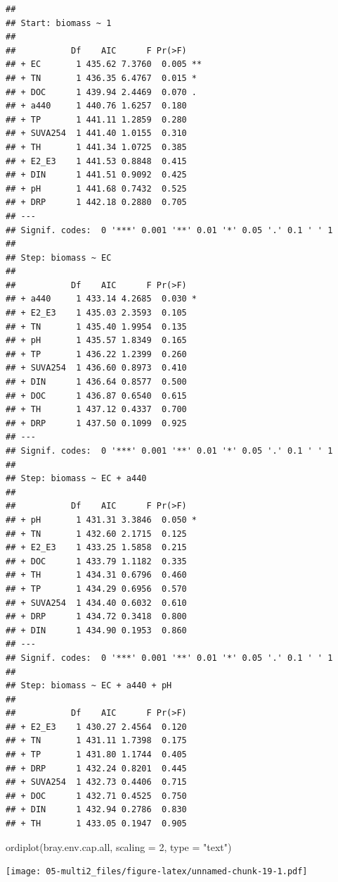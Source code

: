 \documentclass[
]{book}
\newenvironment{Shaded}{\begin{snugshade}}{\end{snugshade}}
\newcommand{\AttributeTok}[1]{\textcolor[rgb]{0.77,0.63,0.00}{#1}}
\newcommand{\DecValTok}[1]{\textcolor[rgb]{0.00,0.00,0.81}{#1}}
\newcommand{\FunctionTok}[1]{\textcolor[rgb]{0.00,0.00,0.00}{#1}}
\newcommand{\NormalTok}[1]{#1}
\newcommand{\StringTok}[1]{\textcolor[rgb]{0.31,0.60,0.02}{#1}}
\begin{document}
\begin{verbatim}
## 
## Start: biomass ~ 1 
## 
##           Df    AIC      F Pr(>F)   
## + EC       1 435.62 7.3760  0.005 **
## + TN       1 436.35 6.4767  0.015 * 
## + DOC      1 439.94 2.4469  0.070 . 
## + a440     1 440.76 1.6257  0.180   
## + TP       1 441.11 1.2859  0.280   
## + SUVA254  1 441.40 1.0155  0.310   
## + TH       1 441.34 1.0725  0.385   
## + E2_E3    1 441.53 0.8848  0.415   
## + DIN      1 441.51 0.9092  0.425   
## + pH       1 441.68 0.7432  0.525   
## + DRP      1 442.18 0.2880  0.705   
## ---
## Signif. codes:  0 '***' 0.001 '**' 0.01 '*' 0.05 '.' 0.1 ' ' 1
## 
## Step: biomass ~ EC 
## 
##           Df    AIC      F Pr(>F)  
## + a440     1 433.14 4.2685  0.030 *
## + E2_E3    1 435.03 2.3593  0.105  
## + TN       1 435.40 1.9954  0.135  
## + pH       1 435.57 1.8349  0.165  
## + TP       1 436.22 1.2399  0.260  
## + SUVA254  1 436.60 0.8973  0.410  
## + DIN      1 436.64 0.8577  0.500  
## + DOC      1 436.87 0.6540  0.615  
## + TH       1 437.12 0.4337  0.700  
## + DRP      1 437.50 0.1099  0.925  
## ---
## Signif. codes:  0 '***' 0.001 '**' 0.01 '*' 0.05 '.' 0.1 ' ' 1
## 
## Step: biomass ~ EC + a440 
## 
##           Df    AIC      F Pr(>F)  
## + pH       1 431.31 3.3846  0.050 *
## + TN       1 432.60 2.1715  0.125  
## + E2_E3    1 433.25 1.5858  0.215  
## + DOC      1 433.79 1.1182  0.335  
## + TH       1 434.31 0.6796  0.460  
## + TP       1 434.29 0.6956  0.570  
## + SUVA254  1 434.40 0.6032  0.610  
## + DRP      1 434.72 0.3418  0.800  
## + DIN      1 434.90 0.1953  0.860  
## ---
## Signif. codes:  0 '***' 0.001 '**' 0.01 '*' 0.05 '.' 0.1 ' ' 1
## 
## Step: biomass ~ EC + a440 + pH 
## 
##           Df    AIC      F Pr(>F)
## + E2_E3    1 430.27 2.4564  0.120
## + TN       1 431.11 1.7398  0.175
## + TP       1 431.80 1.1744  0.405
## + DRP      1 432.24 0.8201  0.445
## + SUVA254  1 432.73 0.4406  0.715
## + DOC      1 432.71 0.4525  0.750
## + DIN      1 432.94 0.2786  0.830
## + TH       1 433.05 0.1947  0.905
\end{verbatim}

\begin{Shaded}
\begin{Highlighting}[]
\FunctionTok{ordiplot}\NormalTok{(bray.env.cap.all, }\AttributeTok{scaling =} \DecValTok{2}\NormalTok{, }\AttributeTok{type =} \StringTok{"text"}\NormalTok{)}
\end{Highlighting}
\end{Shaded}

\texttt{[image: 05-multi2\_files/figure-latex/unnamed-chunk-19-1.pdf]}
\end{document}
